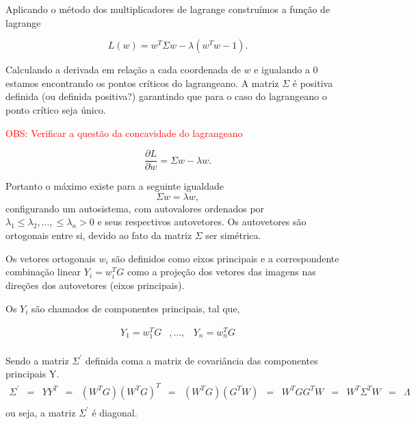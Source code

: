 Aplicando o método dos multiplicadores de lagrange construímos a função de lagrange

\begin{equation}\label{cap_fusao_68}
	L(w)= w^T\Sigma w -\lambda(w^Tw - 1).
\end{equation}

Calculando a derivada em relação a cada coordenada de $w$ e igualando a $0$ estamos encontrando os pontos críticos do lagrangeano. A matriz $\Sigma$ é positiva definida (ou definida positiva?) garantindo que para o caso do lagrangeano o ponto crítico seja único.

\textcolor{red}{OBS: Verificar a questão da concavidade do lagrangeano}

\begin{equation}\label{cap_fusao_69}
\frac{\partial L}{\partial w}= \Sigma w -\lambda w .
\end{equation}

Portanto o máximo existe para a seguinte igualdade
\begin{equation}\label{cap_fusao_70}
\Sigma w =\lambda w,
\end{equation}
configurando um autosistema, com autovalores ordenados por $\lambda_1\leq\lambda_2,\ldots,\leq\lambda_n>0$ e seus respectivos autovetores. Os autovetores são ortogonais entre si, devido ao fato da matriz $\Sigma$ ser simétrica.

Os vetores ortogonais $w_i$ são definidos como eixos principais e a correspondente combinação linear $Y_i=w_i^TG$ como a projeção dos vetores das imagens nas direções dos autovetores (eixos principais).

Os $Y_i$ são chamados de componentes principais, tal que,

\begin{equation*}
\begin{aligned}
Y_1=w_1^TG&,\ldots, &Y_n=w_n^TG \\
\end{aligned}
\end{equation*}

Sendo a matriz $\Sigma^{'}$ definida coma a matriz de covariância das componentes principais $\mathrm{Y}$.
\begin{equation*}
\begin{aligned}
	\Sigma^{'}&= &YY^T&=&(W^TG)(W^TG)^T&=&(W^TG)(G^TW)&=&W^TGG^TW&=&W^T\Sigma^TW&=&\Lambda\\
\end{aligned}
\end{equation*}
ou seja, a matriz $\Sigma^{'}$ é diagonal.

